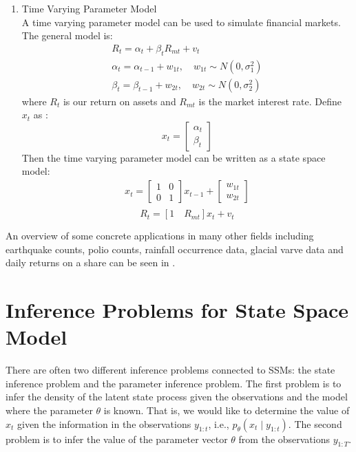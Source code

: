 \documentclass[mstat,12pt]{unswthesis}  %
\numberwithin{equation}{section}
\begin{document}
\begin{enumerate}
    
    
    \item Time Varying Parameter Model\\
    A time varying parameter model can be used to simulate financial markets. The general model is:
    \begin{equation}\begin{array}{c}
    R_{t}=\alpha_{t}+\beta_{t} R_{m t}+v_{t} \\
    \alpha_{t}=\alpha_{t-1}+w_{1 t}, \quad w_{1 t} \sim N\left(0, \sigma_{1}^{2}\right) \\
    \beta_{t}=\beta_{t-1}+w_{2 t},  \quad w_{2 t} \sim N\left(0, \sigma_{2}^{2}\right)
    \end{array}\end{equation}
    where $R_{t}$ is our return on assets and $R_{mt}$ is the market interest rate. 
    Define $x_{t}$ as :
    \begin{equation}x_{t}=\left[\begin{array}{l}
    \alpha_{t} \\
    \beta_{t}
    \end{array}\right]\end{equation}
    Then the time varying parameter model can be written as a state space model:
    \begin{equation}\begin{array}{c}
    x_{t}=\left[\begin{array}{cc}
    1 & 0\\
    0 & 1
    \end{array}\right] x_{t-1}+\left[\begin{array}{c}
    w_{1 t} \\
    w_{2 t}
    \end{array}\right] \\
    \end{array}
    \end{equation}
    \begin{equation}
    R_{t}=\left[1\quad R_{m t}\right] x_{t}+v_{t}
    \end{equation}
    
\end{enumerate}
An overview of some concrete applications in many other fields including earthquake counts, polio counts, rainfall occurrence data, glacial varve data and daily returns on a share can be seen in \cite{langrock2011some}.

\section{Inference Problems for State Space Model}
\noindent  There are often two different inference problems connected to SSMs: 
the state inference problem and the parameter inference problem.
The first problem is to infer the density of the latent state process given the observations and the model where the
parameter $\theta$ is known. That is, we would like to determine the value of $x_{t}$ given the information in the observations $y_{1:t}$, i.e., $p_{\theta}\left(x_{t} \mid y_{1: t}\right)$. 
The second problem is to infer the value of the parameter vector $\theta$ from the observations $y_{1: T}$. \\
\end{document}

